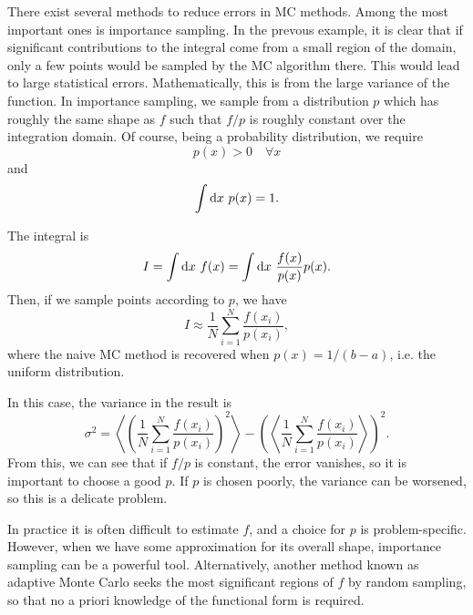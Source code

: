 There exist several methods to reduce errors in \gls{MC} methods.\supercite{jamesMonte1980} Among the most important ones is importance sampling.\supercite{kahnModification1959} In the prevous example, it is clear that if significant contributions to the integral come from a small region of the domain, only a few points would be sampled by the \gls{MC} algorithm there. This would lead to large statistical errors. Mathematically, this is from the large variance of the function. In importance sampling, we sample from a distribution $p$ which has roughly the same shape as $f$ such that $f/p$ is roughly constant over the integration domain. Of course, being a probability distribution, we require
\begin{equation}
    p(x)>0 \quad \forall x
\end{equation}
and
\begin{equation}
    \int\mathrm{d} x \ p(x) = 1.
\end{equation}

The integral is
\begin{equation}
    I = \int\mathrm{d} x \  f(x) = \int\mathrm{d} x\ \frac{f(x)}{p(x)} p(x).
\end{equation}
Then, if we sample points according to $p$, we have
\begin{equation}
    I\approx \frac{1}{N}\sum^N_{i=1} \frac{f(x_i)}{p(x_i)},
\end{equation}
where the naive \gls{MC} method is recovered when $p(x)=1/(b-a)$, i.e. the uniform distribution.

In this case, the variance in the result is
\begin{equation}
    \sigma^2 = \left\langle \left( \frac{1}{N}\sum^N_{i=1} \frac{f(x_i)}{p(x_i)}\right)^2\right\rangle - \left( \left\langle  \frac{1}{N}\sum^N_{i=1} \frac{f(x_i)}{p(x_i)}\right\rangle\right)^2.
\end{equation}
From this, we can see that if $f/p$ is constant, the error vanishes, so it is important to choose a good $p$. If $p$ is chosen poorly, the variance can be worsened, so this is a delicate problem.

In practice it is often difficult to estimate $f$, and a choice for $p$ is problem-specific. However, when we have some approximation for its overall shape, importance sampling can be a powerful tool. Alternatively, another method known as adaptive Monte Carlo\cite{arounaAdaptative2004} seeks the most significant regions of $f$ by random sampling, so that no a priori knowledge of the functional form is required.

